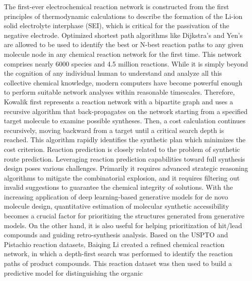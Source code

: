 \documentclass[%
 aip,
 jmp,%
 amsmath,amssymb,
 reprint,%
]{revtex4-2}
\begin{document}
The first-ever electrochemical reaction network is constructed from the first principles of thermodynamic calculations to describe the formation of the Li-ion solid electrolyte interphase (SEI), which is critical for the passivation of the negative electrode. Optimized shortest path algorithms like Dijkstra's and Yen's are allowed to be used to identify the best or N-best reaction paths to any given molecule node in any chemical reaction network for the first time. This network comprises nearly 6000 species and 4.5 million reactions\cite{blau2021chemically}.
While it is simply beyond the cognition of any individual human to understand and analyze all this collective chemical knowledge, modern computers have become powerful enough to perform suitable network analyses within reasonable timescales. Therefore, Kowalik first represents a reaction network with a bipartite graph and uses a recursive algorithm that back-propagates on the network starting from a specified target molecule to examine possible syntheses. Then, a cost calculation continues recursively, moving backward from a target until a critical search depth is reached. This algorithm rapidly identifies the synthetic plan which minimizes the cost criterion\cite{kowalik2012parallel}.
Reaction prediction is closely related to the problem of synthetic route prediction. 
Leveraging reaction prediction capabilities toward full synthesis design poses various challenges. 
Primarily it requires advanced strategic reasoning algorithms to mitigate the combinatorial explosion, 
and it requires filtering out invalid suggestions to guarantee the chemical integrity of solutions\cite{ravitz2013data}.
With the increasing application of deep learning-based generative models for de novo molecule design, quantitative estimation of molecular synthetic accessibility becomes a crucial factor for prioritizing the structures generated from generative models. On the other hand, it is also useful for helping prioritization of hit/lead compounds and guiding retro-synthesis analysis. Based on the USPTO and Pistachio reaction datasets, Baiqing Li created a refined chemical reaction network, in which a depth-first search was performed to identify the reaction paths of product compounds. This reaction dataset was then used to build a predictive model for distinguishing the organic 
\end{document}
